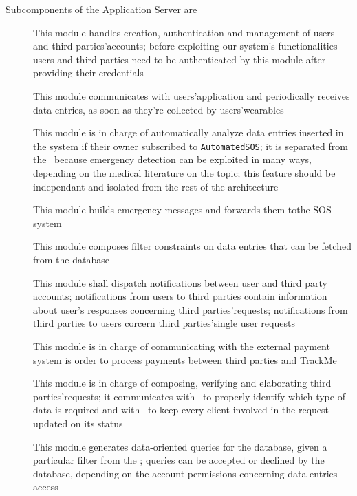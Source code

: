 \documentclass[../DD0.tex]{subfiles}
\begin{document}
        Subcomponents of the Application Server are
        \begin{description}
          \item[\AccountManager] This module handles creation, authentication and management of users and third parties'accounts; before exploiting our system's functionalities users and third parties need to be authenticated by this module after providing their credentials
          \item[\DataCollector] This module communicates with users'application and periodically receives data entries, as soon as they're collected by users'wearables
          \item[\EmergencyDetector] This module is in charge of automatically analyze data entries inserted in the system if their owner subscribed to \texttt{AutomatedSOS}; it is separated from the \DataCollector\ because emergency detection can be exploited in many ways, depending on the medical literature on the topic; this feature should be independant and isolated from the rest of the architecture
          \item[\EmergencyDispatcher] This module builds emergency messages and forwards them tothe SOS system
          \item[\FilterManager] This module composes filter constraints on data entries that can be fetched from the database
          \item[\NotificationManager] This module shall dispatch notifications between user and third party accounts; notifications from users to third parties contain information about user's responses concerning third parties'requests; notifications from third parties to users corcern third parties'single user requests
          \item[\PaymentGateway] This module is in charge of communicating with the external payment system is order to process payments between third parties and TrackMe
          \item[\RequestManager] This module is in charge of composing, verifying and elaborating third parties'requests; it communicates with \FilterManager\ to properly identify which type of data is required and with \NotificationManager\ to keep every client involved in the request updated on its status
          \item[\SetBuilder] This module generates data-oriented queries for the database, given a particular filter from the \FilterManager; queries can be accepted or declined by the database, depending on the account permissions concerning data entries access
        \end{description}
\end{document}
